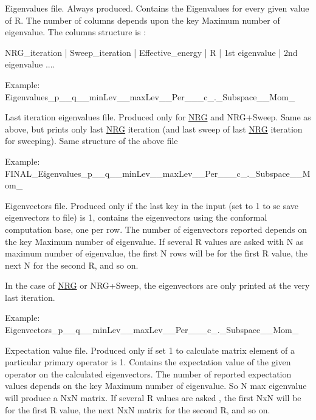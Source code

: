 \begin{DoxyItemize}
\item Eigenvalues file. Always produced. Contains the Eigenvalues for every given value of R. The number of columns depends upon the key {\ttfamily Maximum number of eigenvalue}. The columns structure is \+: \begin{DoxyVerb}NRG_iteration   |  Sweep_iteration | Effective_energy |   R   |  1st eigenvalue | 2nd eigenvalue ....
\end{DoxyVerb}


Example\+: {\ttfamily Eigenvalues\+\_\+p\+\_\+\_\+q\+\_\+\_\+min\+Lev\+\_\+\_\+max\+Lev\+\_\+\_\+\+Per\+\_\+\_\+\_\+c\+\_.\+\_\+\+Subspace\+\_\+\_\+\+Mom\+\_}
\item Last iteration eigenvalues file. Produced only for \mbox{\hyperlink{classNRG}{N\+RG}} and N\+R\+G+\+Sweep. Same as above, but prints only last \mbox{\hyperlink{classNRG}{N\+RG}} iteration (and last sweep of last \mbox{\hyperlink{classNRG}{N\+RG}} iteration for sweeping). Same structure of the above file

Example\+: {\ttfamily F\+I\+N\+A\+L\+\_\+\+Eigenvalues\+\_\+p\+\_\+\_\+q\+\_\+\_\+min\+Lev\+\_\+\_\+max\+Lev\+\_\+\_\+\+Per\+\_\+\_\+\_\+c\+\_.\+\_\+\+Subspace\+\_\+\_\+\+Mom\+\_}
\item Eigenvectors file. Produced only if the last key in the input ({\ttfamily set to 1 to se save eigenvectors to file}) is 1, contains the eigenvectors using the conformal computation base, one per row. The number of eigenvectors reported depends on the key {\ttfamily Maximum number of eigenvalue}. If several R values are asked with N as maximum number of eigenvalue, the first N rows will be for the first R value, the next N for the second R, and so on.

In the case of \mbox{\hyperlink{classNRG}{N\+RG}} or N\+R\+G+\+Sweep, the eigenvectors are only printed at the very last iteration.

Example\+: {\ttfamily Eigenvectors\+\_\+p\+\_\+\_\+q\+\_\+\_\+min\+Lev\+\_\+\_\+max\+Lev\+\_\+\_\+\+Per\+\_\+\_\+\_\+c\+\_.\+\_\+\+Subspace\+\_\+\_\+\+Mom\+\_}
\item Expectation value file. Produced only if {\ttfamily set 1 to calculate matrix element of a particular primary operator} is 1. Contains the expectation value of the given operator on the calculated eigenvectors. The number of reported expectation values depends on the key {\ttfamily Maximum number of eigenvalue}. So N max eigenvalue will produce a NxN matrix. If several R values are asked , the first NxN will be for the first R value, the next NxN matrix for the second R, and so on.


\end{DoxyItemize}
